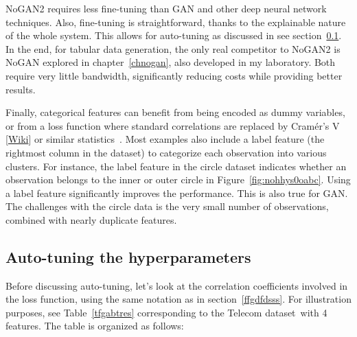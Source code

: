 \documentclass[oneside,10pt]{book}
\begin{document}
 NoGAN2 requires less fine-tuning than GAN and other deep neural network techniques. Also, fine-tuning is straightforward, thanks to the explainable nature of the whole system. This allows for auto-tuning as discussed in see section~\ref{hphjkr}. In the end, for tabular data generation, the only real competitor to NoGAN2 is NoGAN explored in chapter~\ref{chnogan}, also developed in my laboratory. Both require very little bandwidth, significantly reducing costs while providing better results.

Finally, categorical features can benefit from being encoded as dummy variables, or from a loss function where standard correlations are replaced
 by \textcolor{index}{Cramér's V} [\href{https://mltblog.com/45VfElW}{Wiki}] or similar statistics~\cite{crame17}. Most examples also include a
 \textcolor{index}{label feature} (the rightmost column in the dataset) to categorize each observation into various clusters. For instance, the label feature in the circle dataset indicates whether an observation belongs to the inner or outer circle in Figure~\ref{fig:nohhys0oabc}.
 Using a label feature significantly improves the performance. This is also true for GAN. The challenges with the circle data is the very small number of observations, combined with nearly duplicate features.








\subsection{Auto-tuning the hyperparameters}\label{hphjkr}

Before discussing \textcolor{index}{auto-tuning}, let's look at the correlation coefficients involved in
the loss function, using the same notation as in section~\ref{ffgdfdsss}. For illustration purposes, see Table~\ref{tfgabtres} corresponding to the
 Telecom dataset~with 4 features. The table is organized as follows: \vspace{1ex}
\end{document}
